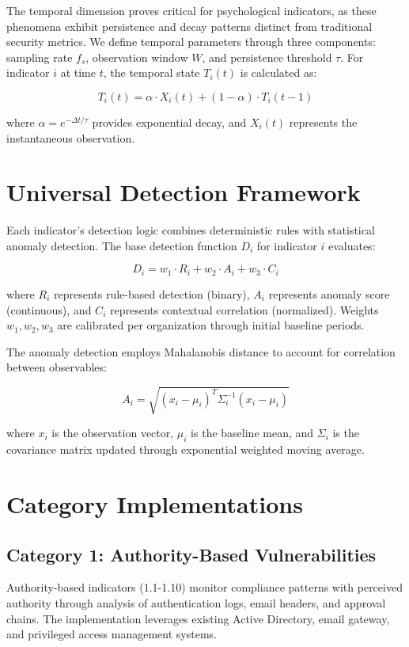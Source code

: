 \documentclass[10pt, twocolumn]{article}
\begin{document}
The temporal dimension proves critical for psychological indicators, as these phenomena exhibit persistence and decay patterns distinct from traditional security metrics. We define temporal parameters through three components: sampling rate $f_s$, observation window $W$, and persistence threshold $\tau$. For indicator $i$ at time $t$, the temporal state $T_i(t)$ is calculated as:

$$T_i(t) = \alpha \cdot X_i(t) + (1-\alpha) \cdot T_i(t-1)$$

where $\alpha = e^{-\Delta t/\tau}$ provides exponential decay, and $X_i(t)$ represents the instantaneous observation.

\section{Universal Detection Framework}

Each indicator's detection logic combines deterministic rules with statistical anomaly detection. The base detection function $D_i$ for indicator $i$ evaluates:

$$D_i = w_1 \cdot R_i + w_2 \cdot A_i + w_3 \cdot C_i$$

where $R_i$ represents rule-based detection (binary), $A_i$ represents anomaly score (continuous), and $C_i$ represents contextual correlation (normalized). Weights $w_1, w_2, w_3$ are calibrated per organization through initial baseline periods.

The anomaly detection employs Mahalanobis distance to account for correlation between observables:

$$A_i = \sqrt{(x_i - \mu_i)^T \Sigma_i^{-1} (x_i - \mu_i)}$$

where $x_i$ is the observation vector, $\mu_i$ is the baseline mean, and $\Sigma_i$ is the covariance matrix updated through exponential weighted moving average.

\section{Category Implementations}

\subsection{Category 1: Authority-Based Vulnerabilities}

Authority-based indicators (1.1-1.10) monitor compliance patterns with perceived authority through analysis of authentication logs, email headers, and approval chains. The implementation leverages existing Active Directory, email gateway, and privileged access management systems.
\end{document}
